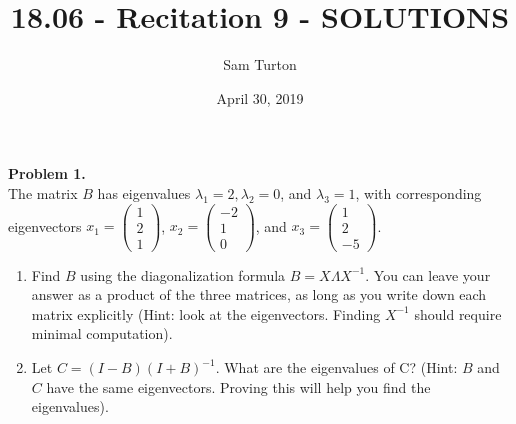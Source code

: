 \documentclass[11pt]{article}
\title{18.06 - Recitation 9 - SOLUTIONS}
\author{Sam Turton}
\date{April 30, 2019}
\begin{document}
\maketitle

\noindent \textbf{Problem 1.}\\
The matrix $B$ has eigenvalues $\lambda_1 = 2, \lambda_2 = 0$, and $\lambda_3 = 1$, with corresponding eigenvectors $x_1 = \begin{pmatrix} 1 \\ 2 \\ 1 \end{pmatrix}$, $x_2 = \begin{pmatrix} -2 \\ 1 \\ 0 \end{pmatrix}$, and $x_3 = \begin{pmatrix} 1 \\ 2 \\ -5 \end{pmatrix}$.
\begin{enumerate}
\item Find $B$ using the diagonalization formula $B = X\Lambda X^{-1}$. You can leave your answer as a product of the three matrices, as long as you write down each matrix explicitly (Hint: look at the eigenvectors. Finding $X^{-1}$ should require minimal computation).
\item Let $C=(I-B)(I+B)^{-1}$. What are the eigenvalues of C? (Hint: $B$ and $C$ have the same eigenvectors. Proving this will help you find the eigenvalues).
\end{enumerate}

\
\end{document}
